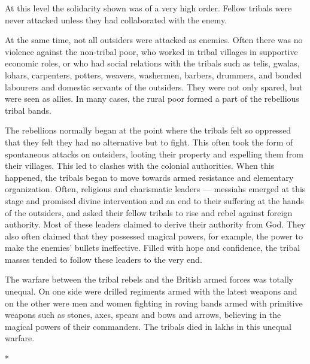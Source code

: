 At this level the solidarity shown was of a very high order. Fellow tribals were never attacked unless they had collaborated with the enemy.

At the same time, not all outsiders were attacked as enemies. Often there was no violence against the non-tribal poor, who worked in tribal villages in supportive economic roles, or who had social relations with the tribals such as telis, gwalas, lohars, carpenters, potters, weavers, washermen, barbers, drummers, and bonded labourers and domestic servants of the outsiders. They were not only spared, but were seen as allies. In many cases, the rural poor formed a part of the rebellious tribal bands.

The rebellions normally began at the point where the tribals felt so oppressed that they felt they had no alternative but to fight. This often took the form of spontaneous attacks on outsiders, looting their property and expelling them from their villages. This led to clashes with the colonial authorities. When this happened, the tribals began to move towards armed resistance and elementary organization. Often, religious and charismatic leaders --- messiahs emerged at this stage and promised divine intervention and an end to their suffering at the hands of the outsiders, and asked their fellow tribals to rise and rebel against foreign authority. Most of these leaders claimed to derive their authority from God. They also often claimed that they possessed magical powers, for example, the power to make the enemies' bullets ineffective. Filled with hope and confidence, the tribal masses tended to follow these leaders to the very end.

The warfare between the tribal rebels and the British armed forces was totally unequal. On one side were drilled regiments armed with the latest weapons and on the other were men and women fighting in roving bands armed with primitive weapons such as stones, axes, spears and bows and arrows, believing in the magical powers of their commanders. The tribals died in lakhs in this unequal warfare.

\begin{center}*\end{center}

